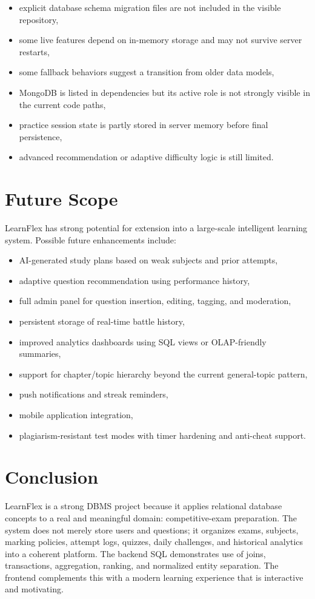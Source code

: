 \documentclass[12pt,a4paper]{article}
\begin{document}
\begin{itemize}[leftmargin=1.5em]
  \item explicit database schema migration files are not included in the visible repository,
  \item some live features depend on in-memory storage and may not survive server restarts,
  \item some fallback behaviors suggest a transition from older data models,
  \item MongoDB is listed in dependencies but its active role is not strongly visible in the current code paths,
  \item practice session state is partly stored in server memory before final persistence,
  \item advanced recommendation or adaptive difficulty logic is still limited.
\end{itemize}

\section{Future Scope}
LearnFlex has strong potential for extension into a large-scale intelligent learning system. Possible future enhancements include:

\begin{itemize}[leftmargin=1.5em]
  \item AI-generated study plans based on weak subjects and prior attempts,
  \item adaptive question recommendation using performance history,
  \item full admin panel for question insertion, editing, tagging, and moderation,
  \item persistent storage of real-time battle history,
  \item improved analytics dashboards using SQL views or OLAP-friendly summaries,
  \item support for chapter/topic hierarchy beyond the current general-topic pattern,
  \item push notifications and streak reminders,
  \item mobile application integration,
  \item plagiarism-resistant test modes with timer hardening and anti-cheat support.
\end{itemize}

\section{Conclusion}
LearnFlex is a strong DBMS project because it applies relational database concepts to a real and meaningful domain: competitive-exam preparation. The system does not merely store users and questions; it organizes exams, subjects, marking policies, attempt logs, quizzes, daily challenges, and historical analytics into a coherent platform. The backend SQL demonstrates use of joins, transactions, aggregation, ranking, and normalized entity separation. The frontend complements this with a modern learning experience that is interactive and motivating.
\end{document}
